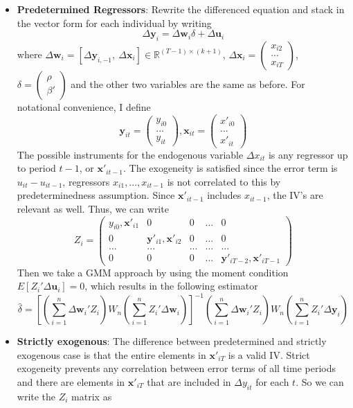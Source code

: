 \begin{itemize}
\item \textbf{Predetermined Regressors}: Rewrite the differenced equation and stack in the vector form for each individual by writing
\[
\Delta \mathbf{y}_i=\Delta \mathbf{w}_i\delta + \Delta \mathbf{u}_i
\]
where $\Delta \mathbf{w}_i=[\Delta \mathbf{y}_{i,-1},\ \Delta \mathbf{x}_i ]\in\mathbb{R}^{(T-1)\times (k+1)}$, $\Delta \mathbf{x}_i=\begin{pmatrix} x_{i2} \\ ... \\x_{iT}\end{pmatrix}$, $\delta=\begin{pmatrix}\rho \\ \beta'\end{pmatrix}$ and the other two variables are the same as before. For notational convenience, I define
\[
\mathbf{y}_{it}=\begin{pmatrix}y_{i0}\\ ... \\ y_{it} \end{pmatrix},\mathbf{x}_{it}=\begin{pmatrix}x'_{i0}\\ ... \\ x'_{it} \end{pmatrix}
\]
The possible instruments for the endogenous variable $\Delta x_{it}$ is any regressor up to period $t-1$, or $\mathbf{x}'_{it-1}$. The exogeneity is satisfied since the error term is $u_{it}-u_{it-1}$, regressors $x_{i1},...,x_{it-1}$ is not correlated to this by predeterminedness assumption. Since $\mathbf{x}'_{it-1}$ includes $x_{it-1}$, the IV's are relevant as well.  Thus, we can write
\[
Z_i = \begin{pmatrix}y_{i0}, \mathbf{x}'_{i1}& 0 &0 &...& 0\\ 0 & \mathbf{y}'_{i1},\mathbf{x}'_{i2} & 0 & ... & 0 \\ ...&...&...&...&...\\ 0 & 0& 0& ... & \mathbf{y}'_{iT-2},\mathbf{x}'_{iT-1}\end{pmatrix}
\]
 Then we take a GMM approach by using the moment condition $E[Z_i'\Delta\mathbf{u}_i]=0$, which results in the following estimator
\[
\hat{\delta}=\left[\left(\sum_{i=1}^n\Delta \mathbf{w}_{i}' Z_i\right)W_n\left(\sum_{i=1}^n Z_i' \Delta \mathbf{w}_{i}\right) \right]^{-1}\left(\sum_{i=1}^n\Delta \mathbf{w}_{i}' Z_i\right)W_n\left(\sum_{i=1}^n Z_i' \Delta \mathbf{y}_i \right)
\]
\item \textbf{Strictly exogenous}: The difference between predetermined and strictly exogenous case is that the entire elements in $\mathbf{x}'_{iT}$ is a valid IV. Strict exogeneity prevents any correlation between error terms of all time periods and there are elements in $\mathbf{x}'_{iT}$ that are included in $\Delta y_{it}$ for each $t$. So we can write the $Z_i$ matrix as

\end{itemize}
